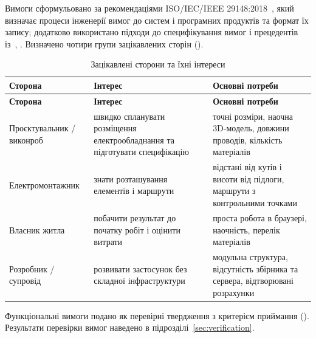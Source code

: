 

Вимоги сформульовано за рекомендаціями ISO/IEC/IEEE 29148:2018~, який визначає процеси інженерії вимог до систем і програмних продуктів та формат їх запису; додатково використано підходи до специфікування вимог і прецедентів із~, . Визначено чотири групи зацікавлених сторін ().

\begin{spacing}{1.15}
\small\noindent
\begin{xltabular}{\textwidth}{| >{\raggedright\arraybackslash}p{4.2cm} | >{\raggedright\arraybackslash}X | >{\raggedright\arraybackslash}X |}
    \caption{Зацікавлені сторони та їхні інтереси} \label{tab:stake} \\
    \hline
    \textbf{Сторона} & \textbf{Інтерес} & \textbf{Основні потреби} \\ \hline
    \endfirsthead

    \hline
    \textbf{Сторона} & \textbf{Інтерес} & \textbf{Основні потреби} \\ \hline
    \endhead

    Проєктувальник / виконроб & швидко спланувати розміщення електрообладнання та підготувати специфікацію & точні розміри, наочна 3D-модель, довжини проводів, кількість матеріалів \\ \hline
    Електромонтажник & знати розташування елементів і маршрути & відстані від кутів і висоти від підлоги, маршрути з контрольними точками \\ \hline
    Власник житла & побачити результат до початку робіт і оцінити витрати & проста робота в браузері, наочність, перелік матеріалів \\ \hline
    Розробник / супровід & розвивати застосунок без складної інфраструктури & модульна структура, відсутність збірника та сервера, відтворювані розрахунки \\ \hline
\end{xltabular}
\end{spacing}


Функціональні вимоги подано як перевірні твердження з критерієм приймання (). Результати перевірки вимог наведено в підрозділі~\ref{sec:verification}.

